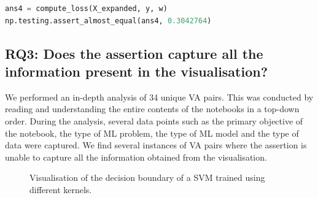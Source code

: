 \documentclass[conference]{IEEEtran}
\begin{document}
\begin{lstlisting}[language=Python, caption={Assertion to check that the loss of the model is similar to the specified value.}, label={lst:np-almost-equal}]
ans4 = compute_loss(X_expanded, y, w)
np.testing.assert_almost_equal(ans4, 0.3042764) 
\end{lstlisting}

\subsection{RQ3: Does the assertion capture all the information present in the visualisation?}\label{sec:result-rq2-p3}

We performed an in-depth analysis of 34 unique VA pairs. This was conducted by reading and understanding the entire contents of the notebooks in a top-down order. During the analysis, several data points such as the primary objective of the notebook, the type of ML problem, the type of ML model and the type of data were captured. We find several instances of VA pairs where the assertion is unable to capture all the information obtained from the visualisation.

\begin{figure}
  \hfill
  \caption{Visualisation of the decision boundary of a SVM trained using different kernels.}\label{fig:svm}
\end{figure}
\end{document}
